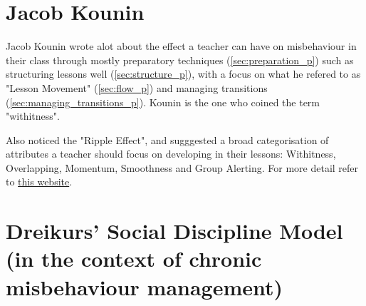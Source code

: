 \documentclass[12pt]{report}
\begin{document}
\section{Jacob Kounin}
\label{sec:kounin_theory}

Jacob Kounin wrote alot about the effect a teacher can have on misbehaviour in their class through mostly preparatory techniques (\ref{sec:preparation_p}) such as structuring lessons well (\ref{sec:structure_p}), with a focus on what he refered to as "Lesson Movement" (\ref{sec:flow_p}) and managing transitions (\ref{sec:managing_transitions_p}). Kounin is the one who coined the term "withitness".

Also noticed the "Ripple Effect", and sugggested a broad categorisation of attributes a teacher should focus on developing in their lessons: Withitness, Overlapping, Momentum, Smoothness and Group Alerting. For more detail refer to \href{http://universityofhullscitts.org.uk/scitts/site/pt/behaviour/kounin.html}{this website}.

\section{Dreikurs' Social Discipline Model (in the context of chronic misbehaviour management)}
\label{sec:dreikur_theory}
\end{document}
